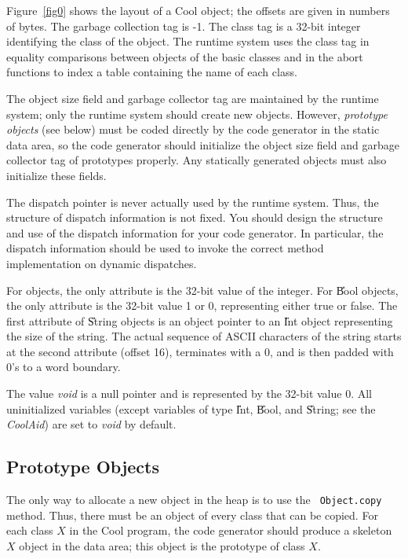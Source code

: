 Figure~\ref{fig0} shows the layout of a Cool object; the offsets are
given in numbers of bytes.  The garbage collection tag is -1.  The
class tag is a 32-bit integer identifying the class of the object. The
runtime system uses the class tag in equality comparisons between
objects of the basic classes and in the abort functions to index a
table containing the name of each class.

The object size field and garbage collector tag are maintained by the
runtime system; only the runtime system should create new objects.
However, {\em prototype objects} (see below) must be coded directly by
the code generator in the static data area, so the code generator
should initialize the object size field and garbage collector tag of
prototypes properly.  Any statically generated objects must also
initialize these fields.

The dispatch pointer is never actually used by the runtime system.
Thus, the structure of dispatch information is not fixed.  You should
design the structure and use of the dispatch information for your code
generator. In particular, the dispatch information should be used to
invoke the correct method implementation on dynamic dispatches.

For  objects, the only attribute is the 32-bit value of the
integer. For \U{Bool} objects, the only attribute is the 32-bit value
1 or 0, representing either true or false.  The first attribute of
\U{String} objects is an object pointer to an \U{Int} object
representing the size of the string. The actual sequence of ASCII
characters of the string starts at the second attribute (offset 16),
terminates with a 0, and is then padded with 0's to a word boundary.

The value {\em void} is a null pointer and is represented by the
32-bit value 0.  All uninitialized variables (except variables of type
\U{Int}, \U{Bool}, and \U{String}; see the {\em CoolAid}) are set to
{\em void} by default.

\subsection{Prototype Objects}

The only way to allocate a new object in the heap is to use the {\tt
Object.copy} method.  Thus, there must be an object of every class
that can be copied.  For each class $X$ in the Cool program, the code
generator should produce a skeleton $X$ object in the data area; this
object is the prototype of class $X$.

